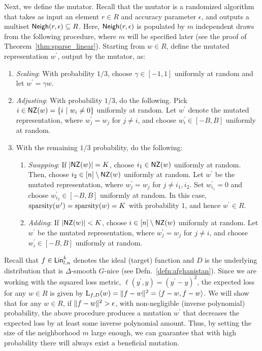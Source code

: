 Next, we define the mutator. Recall that the mutator is a randomized algorithm
that takes as input an element $r \in R$ and accuracy parameter $\epsilon$, and
outputs a multiset $\mathsf{Neigh}(r, \epsilon) \subseteq R$. Here, $\mathsf{Neigh}(r,
\epsilon)$ is populated by $m$ independent draws from the following procedure,
where $m$ will be specified later (see the proof of Theorem~\ref{thm:sparse_linear}).
Starting from $w \in R$, define the mutated representation $w^\prime$, output by
the mutator, as:
\begin{enumerate}
%
\item {\em Scaling}: With probability $1/3$, choose $\gamma \in [-1, 1]$ uniformly at
random and let $w^\prime = \gamma w$. 
%
\item {\em Adjusting}: With probability $1/3$, do the following.  Pick $i \in
\mathsf{NZ}(w) = \{ i~|~ w_i \neq 0 \}$ uniformly at random. Let $w^\prime$ denote the
mutated representation, where $w^\prime_j = w_j$ for $j \neq i$, and choose
$w^\prime_i \in [-B, B]$ uniformly at random.
%
\item With the remaining $1/3$ probability, do the following:
\begin{enumerate}
\item {\em Swapping}: If $|\mathsf{NZ}(w)| = K$, choose $i_1 \in \mathsf{NZ}(w)$ uniformly at random.
Then, choose $i_2 \in [n] \setminus \mathsf{NZ}(w)$ uniformly at random. Let $w^\prime$
be the mutated representation, where $w_j^\prime = w_j$ for $j \neq i_1, i_2$.
Set $w_{i_1}^\prime = 0$ and choose $w_{i_2}^\prime \in [-B, B]$ uniformly at
random. In this case, $\mathrm{sparsity}(w^\prime) = \mathrm{sparsity}(w) = K$
with probability $1$, and hence $w^\prime \in R$.
\item {\em Adding}: If $|\mathsf{NZ}(w)| < K$, choose $i \in [n] \setminus \mathsf{NZ}(w)$ uniformly
at random. Let $w^\prime$ be the mutated representation, where $w_j^\prime =
w_j$ for $j \neq i$, and choose $w^\prime_i \in [-B, B]$ uniformly at random.
\end{enumerate}
\end{enumerate}

Recall that $f \in \mathsf{Lin}^k_{l, u}$ denotes the ideal (target) function and $D$ is the
underlying distribution that is $\Delta$-smooth $G$-nice (see
Defn.~\ref{defn:afghanistan}). Since we are working with the squared loss
metric, $\ell(y^\prime, y) = (y^\prime - y)^2$, the expected loss for any $w \in
R$ is given by $\mathrm{L}_{f, D}(w) = \Vert f - w \Vert^2 = \langle f - w, f - w \rangle$.  We
will show that for any $w \in R$, if $\Vert f - w \Vert^2 > \epsilon$, with
non-negligible (inverse polynomial) probability, the above procedure produces a
mutation $w^\prime$ that decreases the expected loss by at least some inverse
polynomial amount. Thus, by setting the size of the neighborhood $m$ large
enough, we can guarantee that with high probability there will always exist a
beneficial mutation.
%

